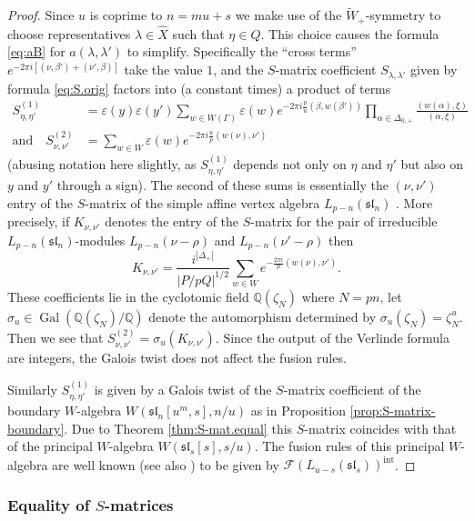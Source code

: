 \documentclass[12pt]{amsart}
\theoremstyle{plain}
\theoremstyle{definition}
\numberwithin{equation}{section}
\DeclareMathOperator{\Gal}{Gal}
\newcommand{\laset}{\widehat{X}}
\newcommand{\al}{\alpha}
\newcommand{\la}{\lambda}
\newcommand{\D}{\Delta}
\newcommand{\Q}{\mathbb{Q}}
\newcommand{\sll}{\mathfrak{sl}}
\newcommand{\CF}{\mathcal{F}}
\newcommand{\wtil}[1]{\widetilde#1}
\begin{document}
\begin{proof}
Since $u$ is coprime to $n = mu + s$ we make use of the $\wtil{W}_+$-symmetry to choose representatives $\la \in \laset$ such that $\eta \in Q$. This choice causes the formula \eqref{eq:aB} for $a(\la, \la')$ to simplify. Specifically the ``cross terms'' $e^{-2\pi i [(\nu, \beta') + (\nu', \beta)]}$ take the value $1$, and the $S$-matrix coefficient $S_{\la, \la'}$ given by formula \eqref{eq:S.orig} factors into (a constant times) a product of terms
\begin{align*}
S^{(1)}_{\eta, \eta'} &= \varepsilon(y) \varepsilon(y') \sum_{w \in W(\Gamma)} \varepsilon(w) e^{-2\pi i \frac{p}{u} (\beta, w(\beta'))} \prod_{\al \in \D_{0, +}} \frac{(w(\al), \xi)}{(\al, \xi)} \\
%
\text{and} \quad S^{(2)}_{\nu, \nu'} &= \sum_{w \in W} \varepsilon(w) e^{-2\pi i \frac{u}{p} (w(\nu), \nu')}
\end{align*}
(abusing notation here slightly, as $S^{(1)}_{\eta, \eta'}$ depends not only on $\eta$ and $\eta'$ but also on $y$ and $y'$ through a sign). The second of these sums is essentially the $(\nu, \nu')$ entry of the $S$-matrix of the simple affine vertex algebra $L_{p-n}(\sll_n)$ \cite{KP84}. More precisely, if $K_{\nu, \nu'}$ denotes the entry of the $S$-matrix for the pair of irreducible $L_{p-n}(\sll_n)$-modules $L_{p-n}(\nu-\rho)$ and $L_{p-n}(\nu'-\rho)$ then
\[
K_{\nu, \nu'} = \frac{i^{|\D_+|}}{|P/pQ|^{1/2}} \sum_{w \in W} e^{-\frac{2\pi i}{p} (w(\nu), \nu')}.
\]
These coefficients lie in the cyclotomic field $\Q(\zeta_N)$ where $N = pn$, let $\sigma_u \in \Gal(\Q(\zeta_N)/\Q)$ denote the automorphism determined by $\sigma_u(\zeta_N) = \zeta_N^u$. Then we see that $S^{(2)}_{\nu, \nu'} = \sigma_u(K_{\nu, \nu'})$. Since the output of the Verlinde formula are integers, the Galois twist does not affect the fusion rules.

Similarly $S^{(1)}_{\eta, \eta'}$ is given by a Galois twist of the $S$-matrix coefficient of the boundary $W$-algebra $W(\sll_n[u^m, s], n/u)$ as in Proposition \ref{prop:S-matrix-boundary}. Due to Theorem \ref{thm:S-mat.equal} this $S$-matrix coincides with that of the principal $W$-algebra $W(\sll_s[s], s/u)$. The fusion rules of this principal $W$-algebra are well known {\cite[Theorem 4.3']{FKW}} (see also \cite[Section 8]{AE2019}) to be given by $\CF(L_{u-s}(\sll_s))^{\text{int}}$.

\end{proof}


\subsubsection{Equality of $S$-matrices}\label{subsec:S-matrices}
\end{document}
